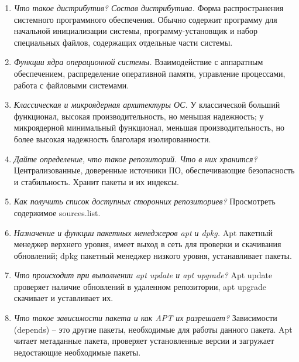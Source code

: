 \begin{enumerate}
	\item \textit{Что такое дистрибутив? Состав дистрибутива.}\newline 
	Форма распространения системного программного обеспечения. Обычно содержит программу для начальной инициализации системы, программу-установщик и набор специальных файлов, содержащих отдельные части системы.
	\item \textit{Функции ядра операционной системы.}\newline 
	Взаимодействие с аппаратным обеспечением, распределение оперативной памяти, управление процессами, работа с файловыми системами.
	\item \textit{Классическая и микроядерная архитектуры ОС.}\newline 
	У классической больший функционал, высокая производительность, но меньшая надежность; у микроядерной минимальный функционал, меньшая производительность, но более высокая надежность благоларя изолированности.
	\item \textit{Дайте определение, что такое репозиторий. Что в них хранится?}\newline 
	Централизованные, доверенные источники ПО, обеспечивающие безопасность и стабильность. Хранит пакеты и их индексы.
	\item \textit{Как получить список доступных сторонних репозиториев?}\newline 
	Просмотреть содержимое sources.list.
	\item \textit{Назначение и функции пакетных менеджеров apt и dpkg.}\newline 
	Apt пакетный менеджер верхнего уровня, имеет выход в сеть для проверки и скачивания обновлений; dpkg пакетный менеджер низкого уровня, устанавливает пакеты.
	\item \textit{Что происходит при выполнении apt update и apt upgrade?}\newline 
	Apt update проверяет наличие обновлений в удаленном репозитории, apt upgrade скачивает и уставливает их.
	\item \textit{Что такое зависимости пакета и как APT их разрешает?}\newline 
	Зависимости (depends) -- это другие пакеты, необходимые для работы данного пакета. Apt читает метаданные пакета, проверяет установленные версии и загружает недостающие необходимые пакеты.
\end{enumerate}
